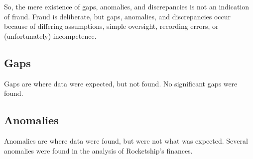 So, the mere existence of gaps, anomalies, and discrepancies is not an indication of fraud. Fraud is deliberate, but gaps, anomalies, and discrepancies occur because of differing assumptions, simple oversight, recording errors, or (unfortunately)  incompetence.

\subsection{Gaps}%
\label{sec:gaps}\indent%

Gaps are where data were expected, but not found. No significant gaps were found.

\subsection{Anomalies}%
\label{sec:anomalies}\indent%

Anomalies are where data were found, but were not what was expected. Several anomalies were found in the analysis of Rocketship's finances.

